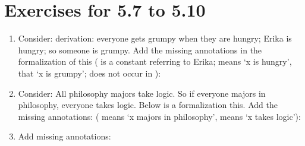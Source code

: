 \section*{Exercises for 5.7 to 5.10}

\begin{enumerate}

\item Consider: derivation: everyone gets grumpy when they are hungry; Erika is 
 hungry; so someone is grumpy.  Add the missing annotations in the formalization 
 of this ( is a constant referring to Erika;  means `x is hungry', 
  that `x is grumpy';  does not occur in \p{\Gamma,\Delta}):


\begin{argumentN}[1]






\end{argumentN}


\item Consider: All philosophy majors take logic. So if everyone majors in 
 philosophy, everyone takes logic. Below is a formalization this.  Add the 
 missing annotations:
 ( means `x majors in philosophy',  means `x takes logic'): 


\begin{argumentN}[1]








\end{argumentN}

\item Add missing annotations:


\end{enumerate}
